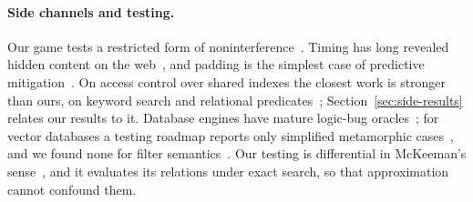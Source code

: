\paragraph{Side channels and testing.}
Our game tests a restricted form of noninterference~\cite{goguen1982security}. Timing has long revealed hidden content on the
web~\cite{felten2000timing,gelernter2015crosssite}, and padding is the simplest case of predictive mitigation~\cite{askarov2010predictive}. On access control over shared indexes the closest work is stronger than ours, on keyword search and relational predicates~\cite{wang2017sidechannel,dar2023rls,rasin2024vulnerability,espiritu2026plaintext}; Section~\ref{sec:side-results} relates our results to it. Database engines
have mature logic-bug oracles~\cite{rigger2020testing,rigger2020detecting}; for vector databases a testing roadmap reports only simplified metamorphic cases~\cite{wang2025towards}, and we found none for filter semantics~\cite{xie2025toward}. Our testing is
differential in McKeeman's sense~\cite{mckeeman1998differential}, and it evaluates its relations under exact search, so that approximation cannot confound them.
